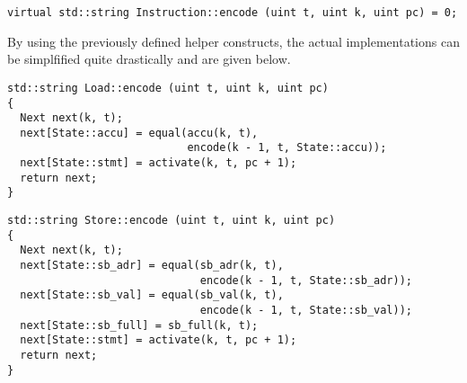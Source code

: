 
\begin{lstlisting}[style=c++]
virtual std::string Instruction::encode (uint t, uint k, uint pc) = 0;
\end{lstlisting}


\noindent
By using the previously defined helper constructs, the actual implementations can be simplfified quite drastically and are given below. %

\newpage

\begin{lstlisting}[style=c++, style=encode]
std::string Load::encode (uint t, uint k, uint pc)
{
  Next next(k, t);
  next[State::accu] = equal(accu(k, t),
                            encode(k - 1, t, State::accu));
  next[State::stmt] = activate(k, t, pc + 1);
  return next;
}
\end{lstlisting}


\begin{lstlisting}[style=c++, style=encode]
std::string Store::encode (uint t, uint k, uint pc)
{
  Next next(k, t);
  next[State::sb_adr] = equal(sb_adr(k, t),
                              encode(k - 1, t, State::sb_adr));
  next[State::sb_val] = equal(sb_val(k, t),
                              encode(k - 1, t, State::sb_val));
  next[State::sb_full] = sb_full(k, t);
  next[State::stmt] = activate(k, t, pc + 1);
  return next;
}
\end{lstlisting}

